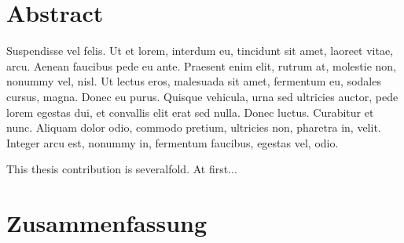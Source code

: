 \chapter*{Abstract}\label{sec:abstract}


Suspendisse vel felis. Ut et lorem, interdum eu, tincidunt sit amet, laoreet vitae, arcu. Aenean faucibus pede eu ante. Praesent enim elit, rutrum at, molestie non, nonummy vel, nisl. Ut lectus eros, malesuada sit amet, fermentum eu, sodales cursus, magna. Donec eu purus. Quisque vehicula, urna sed ultricies auctor, pede lorem egestas dui, et convallis elit erat sed nulla. Donec luctus. Curabitur et nunc. Aliquam dolor odio, commodo pretium, ultricies non, pharetra in, velit. Integer arcu est, nonummy in, fermentum faucibus, egestas vel, odio.

\lipsum[6]

This thesis contribution is severalfold. At first...
\lipsum[6]

\lipsum[6]

%

\cleardoublepage
\chapter*{Zusammenfassung}\label{sec:zusammenfassung}
\lipsum[6]

\lipsum[6]

\lipsum[6]

\lipsum[6]
\cleardoublepage
